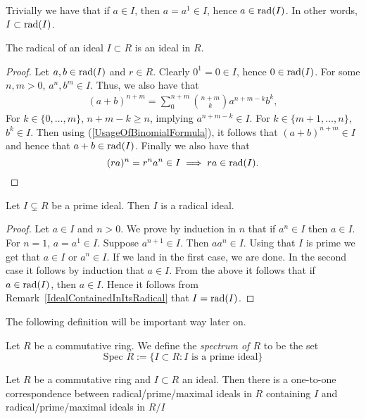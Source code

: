 \begin{remark}\label{IdealContainedInItsRadical}
    Trivially we have that if $a\in I$, then $a=a^1\in I$, hence $a\in \mathrm{rad}(I)$. In other words, $I\subset \mathrm{rad}(I)$.
\end{remark}
\begin{lemma}
    The radical of an ideal $I\subset R$ is an ideal in $R$.
\end{lemma}
\begin{proof}
    Let $a,b \in \mathrm{rad}(I)$ and $r\in R$. Clearly $0^1=0\in I$, hence $0\in \mathrm{rad}(I)$. For some $n,m>0$, $a^n,b^m\in I$. Thus, we also have that 
    \begin{align}\label{UsageOfBinomialFormula}
        (a+b)^{n+m} = \sum_{0}^{n+m} {n+m\choose k} a^{n+m-k}b^k,
    \end{align}
    For $k\in \{0,\dots,m\}$, $n+m-k\geq n$, implying $a^{n+m-k}\in I$. For $k\in \{m+1,\dots,n\}$, $b^k \in I$. Then using (\ref{UsageOfBinomialFormula}), it follows that $(a+b)^{n+m}\in I$ and hence that $a+b \in \mathrm{rad}(I)$. Finally we also have that 
    $$(ra)^n = r^na^n\in I \implies ra\in \mathrm{rad}(I).$$
\end{proof}
\begin{lemma}\label{PrimeIdealIsRadical}
    Let $I\subsetneq R$ be a prime ideal. Then $I$ is a radical ideal.
\end{lemma}
\begin{proof}
    Let $a\in I$ and $n>0$. We prove by induction in $n$ that if $a^n \in I$ then $a \in I$. For $n=1$, $a = a^1\in I$. Suppose $a^{n+1}\in I$. Then $aa^n\in I$. Using that $I$ is prime we get that $a \in I$ or $a^n \in I$. If we land in the first case, we are done. In the second case it follows by induction that $a \in I$.   
    From the above it follows that if $a \in \mathrm{rad}(I)$, then $a \in I$. Hence it follows from Remark~\ref{IdealContainedInItsRadical} that $I = \mathrm{rad}(I)$.
\end{proof}
The following definition will be important way later on. 
\begin{definition}
    Let $R$ be a commutative ring. We define the \textit{spectrum of $R$} to be the set 
    $$\text{Spec } R := \{ I \subset R : I \text{ is a prime ideal}\}$$
\end{definition}
\begin{proposition}\label{RadicalPrimeMaximalIdealsMatchThoseOfQuotientRings}
    Let $R$ be a commutative ring and $I\subset R$ an ideal. Then there is a one-to-one correspondence between radical/prime/maximal ideals in $R$ containing $I$ and radical/prime/maximal ideals in $R/I$  
\end{proposition}
